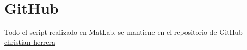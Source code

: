 \section*{GitHub}
Todo el script realizado en MatLab, se mantiene en el repositorio de GitHub \href{https://github.com/christian-herrera/comu-lab-unlp}{christian-herrera}


\hspace{1cm}